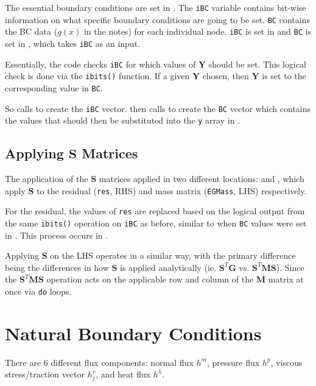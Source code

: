 \documentclass[12pt, letterpaper, twoside]{article}
\renewcommand{\vec}[1]{\bm{#1}}
\newcommand{\ttt}[1]{\texttt{#1}}
\newcommand{\Y}{\vec{Y}}
\newcommand{\G}{\vec{G}}
\newcommand{\M}{\vec{M}}
\newcommand{\Sm}{\vec{S}}
\newcommand{\0}{\vec{0}}
\begin{document}
The essential boundary conditions are set in . The \ttt{iBC} variable contains bit-wise information on what specific boundary conditions are going to be set. \ttt{BC} contains the BC data (\(g(x)\) in the notes) for each individual node. 
\ttt{iBC} is set in  and \ttt{BC} is set in , which takes \ttt{iBC} as an input. 

Essentially, the code checks \ttt{iBC} for which values of \(\Y\) should be set. This logical check is done via the \ttt{ibits()} function. If a given \(\Y\) chosen, then \(\Y\) is set to the corresponding value in \ttt{BC}.

So  calls  to create the \ttt{iBC} vector.  then calls  to create the \ttt{BC} vector which contains the values that should then be substituted into the \ttt{y} array in .


\subsection{Applying \(\vec{S}\) Matrices}
The application of the \(\Sm\) matrices applied in two different locations:  and , which apply \(\Sm\) to the residual (\ttt{res}, RHS) and mass matrix (\ttt{EGMass}, LHS) respectively. 

For the residual, the values of \ttt{res} are replaced based on the logical output from the same \ttt{ibits()} operation on \ttt{iBC} as before, similar to when \ttt{BC} values were set in . This process occurs in . 

Applying \(\Sm\) on the LHS operates in a similar way, with the primary difference being the differences in how \(\Sm\) is applied analytically (ie. \(\Sm^T \G\) vs. \(\Sm^T \M \Sm\)). Since the \(\Sm^T \M \Sm\) operation acts on the applicable row and column of the \(\M\) matrix at once via \ttt{do} loops.

\section{Natural Boundary Conditions}

There are 6 different flux components: normal flux \(h^m\), pressure flux \(h^p\), viscous stress/traction vector \(h^v_j\), and heat flux \(h^h\).
\end{document}
